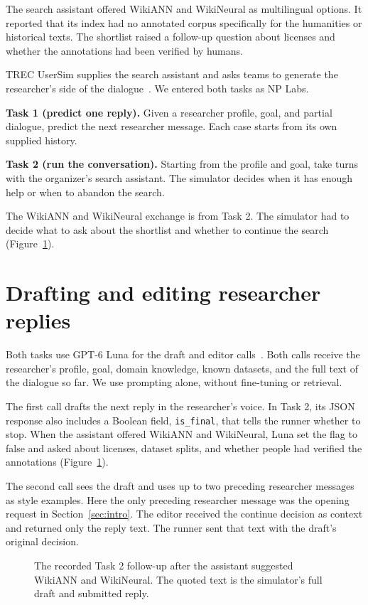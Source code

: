 \documentclass[11pt,letterpaper]{article}
\begin{document}
The search assistant offered WikiANN and WikiNeural as multilingual options. It reported that its index had no annotated corpus specifically for the humanities or historical texts. The shortlist raised a follow-up question about licenses and whether the annotations had been verified by humans.

TREC UserSim supplies the search assistant and asks teams to generate the researcher's side of the dialogue~\cite{track}. We entered both tasks as NP Labs.

\textbf{Task 1 (predict one reply).} Given a researcher profile, goal, and partial dialogue, predict the next researcher message. Each case starts from its own supplied history.

\textbf{Task 2 (run the conversation).} Starting from the profile and goal, take turns with the organizer's search assistant. The simulator decides when it has enough help or when to abandon the search.

The WikiANN and WikiNeural exchange is from Task 2. The simulator had to decide what to ask about the shortlist and whether to continue the search (Figure~\ref{fig:method}).

\clearpage
\section{Drafting and editing researcher replies}

Both tasks use GPT-6 Luna for the draft and editor calls~\cite{code}. Both calls receive the researcher's profile, goal, domain knowledge, known datasets, and the full text of the dialogue so far. We use prompting alone, without fine-tuning or retrieval.

The first call drafts the next reply in the researcher's voice. In Task 2, its JSON response also includes a Boolean field, \texttt{is\_final}, that tells the runner whether to stop. When the assistant offered WikiANN and WikiNeural, Luna set the flag to false and asked about licenses, dataset splits, and whether people had verified the annotations (Figure~\ref{fig:method}).

The second call sees the draft and uses up to two preceding researcher messages as style examples. Here the only preceding researcher message was the opening request in Section~\ref{sec:intro}. The editor received the continue decision as context and returned only the reply text. The runner sent that text with the draft's original decision.

\begin{figure}[H]\centering

\caption{The recorded Task 2 follow-up after the assistant suggested WikiANN and WikiNeural. The quoted text is the simulator's full draft and submitted reply.}\label{fig:method}
\end{figure}
\end{document}
